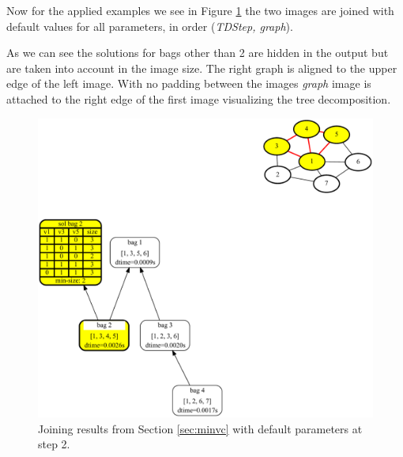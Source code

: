 \documentclass[a4paper, 12pt, bibliography=totoc]{scrartcl}
\begin{document}
Now for the applied examples we see in Figure \ref{fig:joindefault} the two images are joined with default values for all parameters, in order (\textit{TDStep, graph}). 

As we can see the solutions for bags other than 2 are hidden in the output but are taken into account in the image size. The right graph is aligned to the upper edge of the left image. With no padding between the images \textit{graph} image is attached to the right edge of the first image visualizing the {tree decomposition}.

\begin{figure}[H]
	\centering
	\includegraphics[width=\linewidth,height=0.6\textheight,keepaspectratio]{images/SVGJOIN/default2.pdf}
	\caption{Joining results from Section \ref{sec:minvc} with default parameters at step 2.}
	\label{fig:joindefault}
\end{figure}
\end{document}
